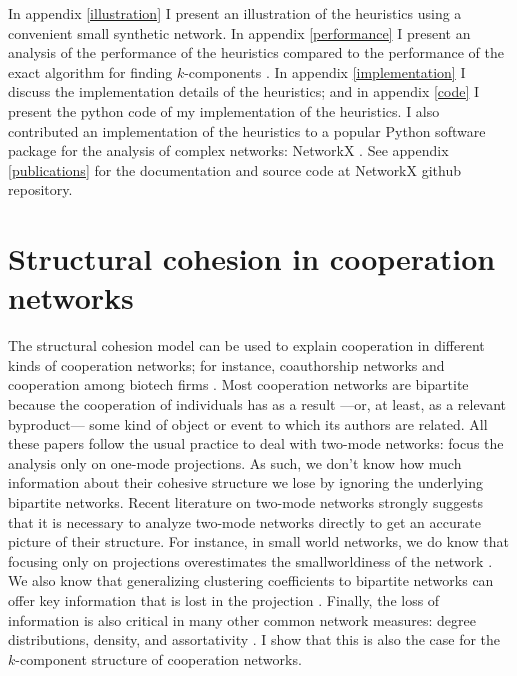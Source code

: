 In appendix \ref{illustration} I present an illustration of the heuristics using a convenient small synthetic network. In appendix \ref{performance} I present an analysis of the performance of the heuristics compared to the performance of the exact algorithm for finding $k$-components \citep{moody:2003}. In appendix \ref{implementation} I discuss the implementation details of the heuristics; and in appendix \ref{code} I present the python code of my implementation of the heuristics. I also contributed an implementation of the heuristics to a popular Python software package for the analysis of complex networks: NetworkX \citep{hagberg:2008}. See appendix \ref{publications} for the documentation and source code at NetworkX github repository.

\section{Structural cohesion in cooperation networks}

The structural cohesion model can be used to explain cooperation in different kinds of cooperation networks; for instance, coauthorship networks \citep{moody:2004, white:2004} and cooperation among biotech firms \citep{powell:2005}. Most cooperation networks are bipartite because the cooperation of individuals has as a result ---or, at least, as a relevant byproduct--- some kind of object or event to which its authors are related. All these papers follow the usual practice to deal with two-mode networks: focus the analysis only on one-mode projections. As such, we don't know how much information about their cohesive structure we lose by ignoring the underlying bipartite networks. Recent literature on two-mode networks strongly suggests that it is necessary to analyze two-mode networks directly to get an accurate picture of their structure. For instance, in small world networks, we do know that focusing only on projections overestimates the smallworldiness of the network \citep{uzzi:2007}. We also know that generalizing clustering coefficients to bipartite networks can offer key information that is lost in the projection  \citep{robins:2004,lind:2005,opsahl:2011}. Finally, the loss of information is also critical in many other common network measures: degree distributions, density, and assortativity \citep{latapy:2008}. I show that this is also the case for the $k$-component structure of cooperation networks.

